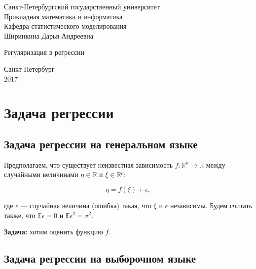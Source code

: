 \documentclass[specialist,
               subf,href,colorlinks=true, 12pt,a4paper]{article} %
\newcommand{\R}{\mathbb{R}}
\newcommand{\E}{\mathbb{E}}
\numberwithin{equation}{section}
\begin{document}
	\thispagestyle{empty}
%
	\begin{center}
		Санкт-Петербургский государственный университет \\
		\vspace{0.3cm}	
		Прикладная математика и информатика \\
		\vspace{0.3cm}
		Кафедра статистического моделирования \\
		
		\vspace{8cm}		
			Ширинкина Дарья Андреевна \\
		{\large 
		   	
			
			\vspace{0.3cm}	
			\Large Регуляризация в регрессии \\
			\vspace{12cm}	

		}
		Санкт-Петербург \\
				2017
	\end{center}
	
\newpage


\tableofcontents
\newpage

\section{Задача регрессии}
\subsection{Задача регрессии на генеральном языке}

Предполагаем, что существует неизвестная зависимость $f: \R^p \rightarrow \R$ между случайными величинами $\eta \in \R$ и $\xi \in \R^p$:

\begin{equation*}
\eta = f(\xi) + \epsilon,
\end{equation*}

где $\epsilon$ --- случайная величина (ошибка) такая, что $\xi$ и $\epsilon$ независимы. Будем считать также, что $\E\epsilon = 0$ и $\E \epsilon^2 = \sigma^2$.

\textbf{Задача:} хотим оценить функцию $f$.

\subsection{Задача регрессии на выборочном языке}
\end{document}
